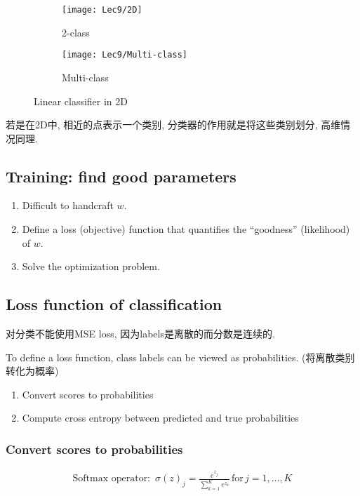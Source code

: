 \begin{figure}[H]
    \centering
    \begin{subfigure}{0.38\textwidth}
        \centering
        \texttt{[image: Lec9/2D]}
        \caption{2-class}
    \end{subfigure}
    \begin{subfigure}{0.28\textwidth}
        \centering
        \texttt{[image: Lec9/Multi-class]}
        \caption{Multi-class}
    \end{subfigure}
    \caption{Linear classifier in 2D}
\end{figure}

若是在2D中, 相近的点表示一个类别, 分类器的作用就是将这些类别划分, 高维情况同理. 

\subsection{Training: find good parameters}
\begin{enumerate}
    \item Difficult to handcraft $w$.
    \item Define a loss (objective) function that quantifies the “goodness” (likelihood) of $w$.
    \item Solve the optimization problem.
\end{enumerate}

\subsection{Loss function of classification}
对分类不能使用MSE loss, 因为labels是离散的而分数是连续的. 

To define a loss function, class labels can be viewed as probabilities. (将离散类别转化为概率)

\begin{enumerate}
    \item Convert scores to probabilities
    \item Compute cross entropy between predicted and true probabilities
\end{enumerate}

\subsubsection{Convert scores to probabilities}

\begin{align*}
    \text{Softmax operator: }\, \sigma (z)_j=\frac{e^{z_j}}{\sum_{k=1}^K e^{z_k}} \, \text{for}\,j=1,\dots,K
\end{align*}

